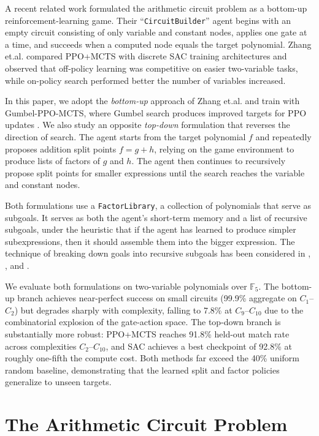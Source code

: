 \documentclass{article}
\theoremstyle{definition}
\theoremstyle{remark}
\begin{document}
A recent related work \citet{Zhang2026CircuitBuilder} formulated the arithmetic circuit problem as a bottom-up reinforcement-learning game. Their ``\texttt{CircuitBuilder}'' agent begins with an empty circuit consisting of only variable and constant nodes, applies one gate at a time, and succeeds when a computed node equals the target polynomial. Zhang et.al. compared PPO+MCTS with discrete SAC training architectures and observed that off-policy learning was competitive on easier two-variable tasks, while on-policy search performed better the number of variables increased. 

In this paper, we adopt the \textit{bottom-up} approach of Zhang et.al. and train with Gumbel-PPO-MCTS, where Gumbel search produces improved targets for PPO updates \citep{Danihelka2022GumbelPlanning,schulman2017ppo}. We also study an opposite \textit{top-down} formulation that reverses the direction of search. The agent starts from the target polynomial $f$ and repeatedly proposes addition split points $f = g+h$, relying on the game environment to produce lists of factors of $g$ and $h$. The agent then continues to recursively propose split points for smaller expressions until the search reaches the variable and constant nodes. 

Both formulations use a \texttt{FactorLibrary}, a collection of polynomials that serve as subgoals. It serves as both the agent's short-term memory and a list of recursive subgoals, under the heuristic that if the agent has learned to produce simpler subexpressions, then it should assemble them into the bigger expression. The technique of breaking down goals into recursive subgoals has been considered in \citet{Kulkarni2016HierarchicalDeepRL}, \citet{Andrychowicz2017HER}, and \citet{Florensa2018AutomaticGoalGeneration}. 

We evaluate both formulations on two-variable polynomials over $\mathbb{F}_5$. The bottom-up branch achieves near-perfect success on small circuits (99.9\% aggregate on $C_1$--$C_2$) but degrades sharply with complexity, falling to 7.8\% at $C_9$--$C_{10}$ due to the combinatorial explosion of the gate-action space. The top-down branch is substantially more robust: PPO+MCTS reaches 91.8\% held-out match rate across complexities $C_2$--$C_{10}$, and SAC achieves a best checkpoint of 92.8\% at roughly one-fifth the compute cost. Both methods far exceed the 40\% uniform random baseline, demonstrating that the learned split and factor policies generalize to unseen targets.

\section{The Arithmetic Circuit Problem}
\label{sec:arithmetic-circuit-problem}
\end{document}
